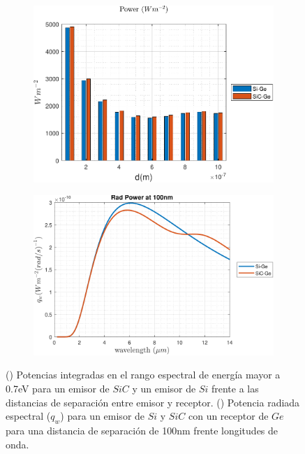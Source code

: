 \begin{figure}[H]
	\centering
	\begin{subfigure}[b]{0.49\textwidth}
		\centering
		\includegraphics[width=1.00\textwidth]{SiCvsSi.pdf}
		\caption{ }
		\label{fig:Prad_SiCGe}
	\end{subfigure}
	\hfill
	\begin{subfigure}[b]{0.49\textwidth}
		\centering
		\includegraphics[width=1.00\textwidth]{SiCvsSi_rad.pdf}
		\caption{ }
		\label{fig:rad_SiCGe}
	\end{subfigure}
	\caption{() Potencias integradas en el rango espectral de energía mayor a 0.7eV para un emisor de $SiC$ y un emisor de $Si$ frente a las distancias de separación entre emisor y receptor. () Potencia radiada espectral ($q_w$) para un emisor de $Si$ y $SiC$ con un receptor de $Ge$ para una distancia de separación de 100nm frente longitudes de onda.}
	\label{fig:rads_SiCGe}
\end{figure}
